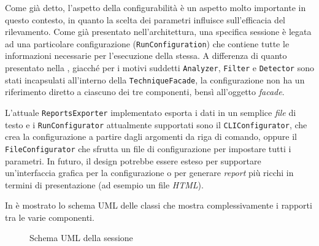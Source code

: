 Come già detto, l'aspetto della configurabilità è un aspetto molto importante in questo contesto, in quanto la scelta dei parametri influisce sull'efficacia del rilevamento.
%
Come già presentato nell'architettura, una specifica sessione è legata ad una particolare configurazione (\texttt{RunConfiguration}) che contiene tutte le informazioni necessarie per l'esecuzione della stessa.
%
A differenza di quanto presentato nella , giacché per i motivi suddetti \texttt{Analyzer}, \texttt{Filter} e \texttt{Detector} sono stati incapsulati all'interno della \texttt{TechniqueFacade}, la configurazione non ha un riferimento diretto a ciascuno dei tre componenti, bensì all'oggetto \textit{facade}.

L'attuale \texttt{ReportsExporter} implementato esporta i dati in un semplice \textit{file} di testo e i \texttt{RunConfigurator} attualmente supportati sono il \texttt{CLIConfigurator}, che crea la configurazione a partire dagli argomenti da riga di comando, oppure il \texttt{FileConfigurator} che sfrutta un file di configurazione per impostare tutti i parametri.
%
In futuro, il design potrebbe essere esteso per supportare un'interfaccia grafica per la configurazione o per generare \textit{report} più ricchi in termini di presentazione (ad esempio un file \textit{HTML}).

In  è mostrato lo schema UML delle classi che mostra complessivamente i rapporti tra le varie componenti.

\begin{figure}
    \caption{Schema UML della sessione}
    \label{img:02-session}
\end{figure}

